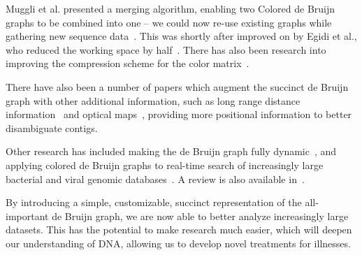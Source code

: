 Muggli et al. presented a merging algorithm, enabling two Colored de Bruijn graphs to be combined into one -- we could now re-use existing graphs while gathering new sequence data~\cite{Mug19}. This was shortly after improved on by Egidi et al., who reduced the working space by half~\cite{Egi19}. There has also been research into improving the compression scheme for the color matrix~\cite{Ali18,Mus18}.

There have also been a number of papers which augment the succinct de Bruijn graph with other additional information, such as long range distance information~\cite{Tur18} and optical maps~\cite{Muk18}, providing more positional information to better disambiguate contigs.

Other research has included making the de Bruijn graph fully dynamic~\cite{Cra18,Bel16}, and applying colored de Bruijn graphs to real-time search of increasingly large bacterial and viral genomic databases~\cite{Bra17}. A review is also available in~\cite{Mar19}.

By introducing a simple, customizable, succinct representation of the all-important de Bruijn graph, we are now able to better analyze increasingly large datasets. This has the potential to make research much easier, which will deepen our understanding of DNA, allowing us to develop novel treatments for illnesses.

